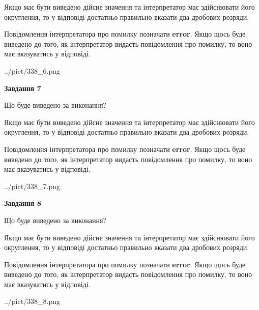 \documentclass[12pt, ukrainian]{article}
\begin{document}
{\begin {Large}
Якщо має бути виведено дійсне значення та інтерпретатор має здійснювати його округлення, 
то у відповіді достатньо правильно вказати два дробових розряди.

Повідомлення інтерпретатора про помилку позначати \textbf{error}.
Якщо щось буде виведено до того, як інтерпретатор видасть повідомлення про помилку, 
то воно має вказуватись у відповіді. \par

\begin{center}
	{../pict/338_6.png}
\end{center}
\newpage

{\begin {center}\textbf{Завдання 7}\end {center}}\par
Що буде виведено за виконання? \par

Якщо має бути виведено дійсне значення та інтерпретатор має здійснювати його округлення, 
то у відповіді достатньо правильно вказати два дробових розряди.

Повідомлення інтерпретатора про помилку позначати \textbf{error}.
Якщо щось буде виведено до того, як інтерпретатор видасть повідомлення про помилку, 
то воно має вказуватись у відповіді. \par

\begin{center}
	{../pict/338_7.png}
\end{center}
\newpage

{\begin {center}\textbf{Завдання 8}\end {center}}\par
Що буде виведено за виконання? \par

Якщо має бути виведено дійсне значення та інтерпретатор має здійснювати його округлення, 
то у відповіді достатньо правильно вказати два дробових розряди.

Повідомлення інтерпретатора про помилку позначати \textbf{error}.
Якщо щось буде виведено до того, як інтерпретатор видасть повідомлення про помилку, 
то воно має вказуватись у відповіді. \par

\begin{center}
	{../pict/338_8.png}
\end{center}
\newpage


\end{Large}}
\end{document}
